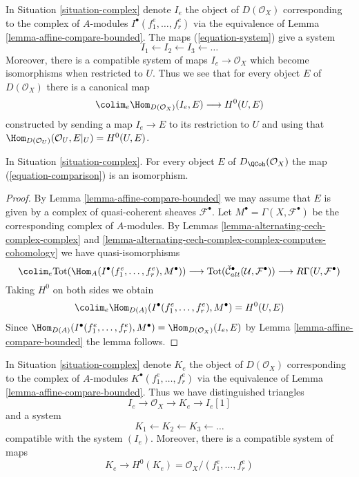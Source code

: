\noindent
In Situation \ref{situation-complex} denote $I_e$ the object of
$D(\mathcal{O}_X)$ corresponding to the complex of $A$-modules
$I^\bullet(f_1^e, \ldots, f_r^e)$ via the equivalence of
Lemma \ref{lemma-affine-compare-bounded}. The maps
(\ref{equation-system}) give a system
$$
I_1 \leftarrow
I_2 \leftarrow
I_3 \leftarrow \ldots
$$
Moreover, there is a compatible system of maps $I_e \to \mathcal{O}_X$
which become isomorphisms when restricted to $U$. Thus we see that for
every object $E$ of $D(\mathcal{O}_X)$ there is a canonical map
\begin{equation}
\label{equation-comparison}
\colim_e \Hom_{D(\mathcal{O}_X)}(I_e, E) \longrightarrow H^0(U, E)
\end{equation}
constructed by sending a map $I_e \to E$ to its restriction to $U$
and using that
$\Hom_{D(\mathcal{O}_U)}(\mathcal{O}_U, E|_U) = H^0(U, E)$.

\begin{proposition}
\label{proposition-represent-cohomology-class-on-open}
In Situation \ref{situation-complex}. For every object $E$
of $D_\QCoh(\mathcal{O}_X)$ the map
(\ref{equation-comparison}) is an isomorphism.
\end{proposition}

\begin{proof}
By Lemma \ref{lemma-affine-compare-bounded} we may assume that $E$
is given by a complex of quasi-coherent sheaves $\mathcal{F}^\bullet$.
Let $M^\bullet = \Gamma(X, \mathcal{F}^\bullet)$ be the corresponding
complex of $A$-modules. By
Lemmas \ref{lemma-alternating-cech-complex-complex} and
\ref{lemma-alternating-cech-complex-complex-computes-cohomology}
we have quasi-isomorphisms
$$
\colim_e \text{Tot}(\Hom_A(I^\bullet(f_1^e, \ldots, f_r^e), M^\bullet))
\longrightarrow
\text{Tot}(\check{\mathcal{C}}_{alt}^\bullet(\mathcal{U}, \mathcal{F}^\bullet))
\longrightarrow
R\Gamma(U, \mathcal{F}^\bullet)
$$
Taking $H^0$ on both sides we obtain
$$
\colim_e \Hom_{D(A)}(I^\bullet(f_1^e, \ldots, f_r^e), M^\bullet)
=
H^0(U, E)
$$
Since $\Hom_{D(A)}(I^\bullet(f_1^e, \ldots, f_r^e), M^\bullet) =
\Hom_{D(\mathcal{O}_X)}(I_e, E)$ by
Lemma \ref{lemma-affine-compare-bounded} the lemma follows.
\end{proof}

\noindent
In Situation \ref{situation-complex} denote $K_e$ the object of
$D(\mathcal{O}_X)$ corresponding to the complex of $A$-modules
$K^\bullet(f_1^e, \ldots, f_r^e)$ via the equivalence of
Lemma \ref{lemma-affine-compare-bounded}. Thus we have distinguished
triangles
$$
I_e \to \mathcal{O}_X \to K_e \to I_e[1]
$$
and a system
$$
K_1 \leftarrow
K_2 \leftarrow
K_3 \leftarrow \ldots
$$
compatible with the system $(I_e)$.
Moreover, there is a compatible system of maps
$$
K_e \to H^0(K_e) = \mathcal{O}_X/(f_1^e, \ldots, f_r^e)
$$


